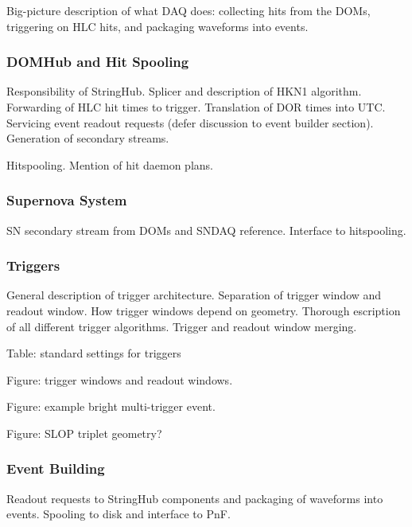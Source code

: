 Big-picture description of what DAQ does: collecting hits from the DOMs,
triggering on HLC hits, and packaging waveforms into events.  

\subsubsection{DOMHub and Hit Spooling}

Responsibility of StringHub.  Splicer and description of HKN1 algorithm.
Forwarding of HLC hit times to trigger.  Translation of DOR times into
UTC.  Servicing event readout requests (defer discussion to event builder
section).  Generation of secondary streams. 

Hitspooling.  Mention of hit daemon plans.  

\subsubsection{Supernova System}

SN secondary stream from DOMs and SNDAQ reference.  Interface to
hitspooling.  

\subsubsection{Triggers}

General description of trigger architecture.  Separation of trigger window
and readout window.  How trigger windows depend on geometry.  Thorough
escription of all different trigger algorithms. Trigger and readout window
merging. 


Table: standard settings for triggers

Figure: trigger windows and readout windows.

Figure: example bright multi-trigger event.  

Figure: SLOP triplet geometry?

\subsubsection{Event Building}

Readout requests to StringHub components and packaging of waveforms into
events.  Spooling to disk and interface to PnF.


